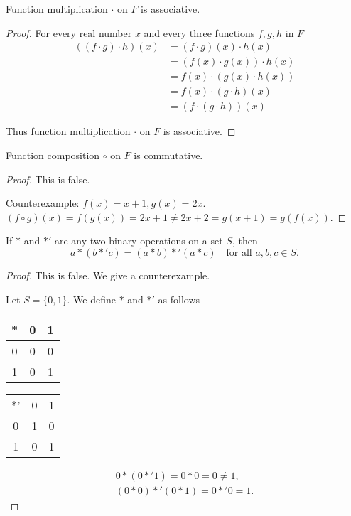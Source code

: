 \newpage
\begin{exercise}
    Function multiplication $\cdot$ on $F$ is associative.
\end{exercise}

\begin{proof}
    For every real number $x$ and every three functions $f, g, h$ in $F$
    \begin{align*}
        ((f \cdot g) \cdot h)(x) & = (f \cdot g)(x) \cdot h(x)    \\
                                 & = (f(x) \cdot g(x)) \cdot h(x) \\
                                 & = f(x) \cdot (g(x) \cdot h(x)) \\
                                 & = f(x) \cdot (g \cdot h)(x)    \\
                                 & = (f \cdot (g \cdot h))(x)
    \end{align*}

    Thus function multiplication $\cdot$ on $F$ is associative.
\end{proof}

\newpage
\begin{exercise}
    Function composition $\circ$ on $F$ is commutative.
\end{exercise}

\begin{proof}
    This is false.

    Counterexample: $f(x) = x + 1, g(x) = 2x$. $(f\circ g)(x) = f(g(x)) = 2x + 1\ne 2x + 2 = g(x + 1) = g(f(x))$.
\end{proof}

\newpage
\begin{exercise}
    If $*$ and $*'$ are any two binary operations on a set $S$, then
    \[
        a * (b *' c) = (a * b) *' (a * c)\quad\text{for all $a, b, c\in S$.}
    \]
\end{exercise}

\begin{proof}
    This is false. We give a counterexample.

    Let $S = \{ 0, 1 \}$. We define $*$ and $*'$ as follows
    \begin{tabular}{c|cc}
        * & 0 & 1 \\
        \midrule
        0 & 0 & 0 \\
        1 & 0 & 1
    \end{tabular}
    \begin{tabular}{c|cc}
        \midrule
        *' & 0 & 1 \\
        0  & 1 & 0 \\
        1  & 0 & 1
    \end{tabular}
    \[
        \begin{split}
            0 * (0 *' 1) = 0 * 0 = 0 \ne 1,  \\
            (0 * 0) *' (0 * 1) = 0 *' 0 = 1.
        \end{split}
    \]
\end{proof}

